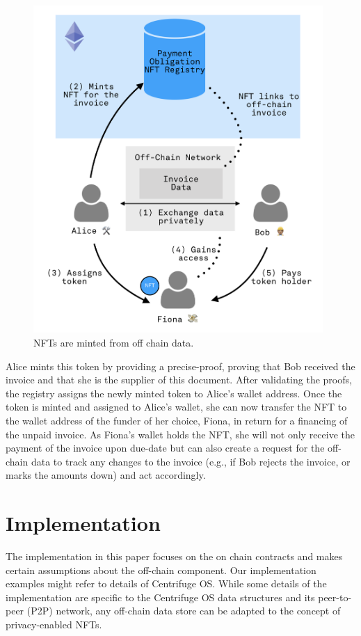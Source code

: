 \documentclass[a4paper, 10pt]{article}
\begin{document}
\begin{figure}[thpb]
  \centering
  \includegraphics[width=11cm]{drawings/introduction.png}
  \caption{NFTs are minted from off chain data.} 
  \label{introduction}
\end{figure}

Alice mints this token by providing a precise-proof, proving that Bob received the invoice and that she is the supplier of this document. After validating the proofs, the registry assigns the newly minted token to Alice’s wallet address. Once the token is minted and assigned to Alice’s wallet, she can now transfer the NFT to the wallet address of the funder of her choice, Fiona, in return for a financing of the unpaid invoice. As Fiona’s wallet holds the NFT, she will not only receive the payment of the invoice upon due-date but can also create a request for the off-chain data to track any changes to the invoice (e.g., if Bob rejects the invoice, or marks the amounts down) and act accordingly.

\section{Implementation}
The implementation in this paper focuses on the on chain contracts and makes certain assumptions about the off-chain component. Our implementation examples might refer to details of Centrifuge OS. While some details of the implementation are specific to the Centrifuge OS data structures and its peer-to-peer (P2P) network, any off-chain data store can be adapted to the concept of privacy-enabled NFTs.
\end{document}
